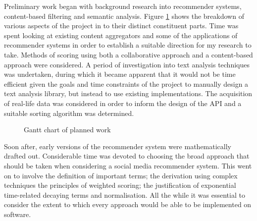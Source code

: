 Preliminary work began with background research into recommender systems, content-based filtering and semantic analysis. Figure \ref{finalGantt} shows the breakdown of various aspects of the project in to their distinct constituent parts. Time was spent looking at existing content aggregators and some of the applications of recommender systems in order to establish a suitable direction for my research to take. Methods of scoring using both a collaborative approach and a content-based approach were considered. A period of investigation into text analysis techniques was undertaken, during which it became apparent that it would not be time efficient given the goals and time constraints of the project to manually design a text analysis library, but instead to use existing implementations. The acquisition of real-life data was considered in order to inform the design of the API and a suitable sorting algorithm was determined.

\begin{figure}[ht!]
    \caption{Gantt chart of planned work}
    \label{finalGantt}
\end{figure} 

Soon after, early versions of the recommender system were mathematically drafted out. Considerable time was devoted to choosing the broad approach that should be taken when considering a social media recommender system. This went on to involve the definition of important terms; the derivation using complex techniques the principles of weighted scoring; the justification of exponential time-related decaying terms and normalisation. All the while it was essential to consider the extent to which every approach would be able to be implemented on software. 

